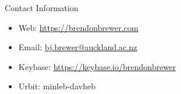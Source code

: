 \documentclass[final,hyperref={pdfpagelabels=false}]{beamer}
\newcommand{\textapprox}{\raisebox{0.5ex}{\texttildelow}}
\begin{document}
\begin{frame}[t]
\begin{columns}[t]
\begin{column}{.465\textwidth}

\begin{block}{Contact Information}

\begin{itemize}
\item Web: \href{https://brendonbrewer.com}{https://brendonbrewer.com}
\item Email: \href{mailto:bj.brewer@auckland.ac.nz}{bj.brewer@auckland.ac.nz}
\item Keybase: \href{https://keybase.io/brendonbrewer}{https://keybase.io/brendonbrewer}
\item Urbit: \textapprox minleb-davheb
\end{itemize}

\end{block}


\end{column} %

\begin{column}{.015\textwidth}\end{column} %

\end{columns} %

\end{frame} %
\end{document}
